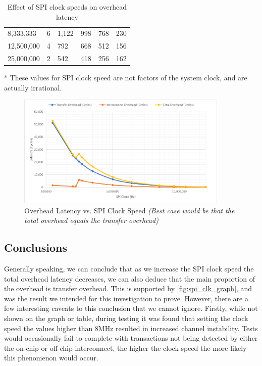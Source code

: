 \begin{table}
\begin{threeparttable}
\begin{tabular}{l|l|l|l|l|l}
     8,333,333\tnote{*}    &  6                   &  1,122               &  998                 & 768                   &  230                                        \\
     12,500,000            &  4                   &  792                 &  668                 & 512                   &  156                                        \\
     25,000,000            &  2                   &  542                 &  418                 & 256                   &  162                                       
    \end{tabular}
    \begin{tablenotes}\footnotesize
        \item[*] These values for SPI clock speed are not factors of the system clock, and are actually irrational.
        \end{tablenotes}
    \end{threeparttable}
    \caption{Effect of SPI clock speeds on overhead latency}
    \label{tbl:spi_clk_results}
\end{table}

\begin{figure}[!htb]
    \centering
    \includegraphics[width=0.9\textwidth]{05_evaluation/images/overhead_vs_spi_clk.png}
    \caption{Overhead Latency vs. SPI Clock Speed \textit{(Best case would be that the total overhead equals the transfer overhead)}} 
    \label{fig:spi_clk_graph}
\end{figure}


\subsection{Conclusions}

Generally speaking, we can conclude that as we increase the SPI clock speed the total overhead latency decreases, we can also deduce that the main proportion of the overhead is transfer overhead. This is supported by \autoref{fig:spi_clk_graph}, and was the result we intended for this investigation to prove. However, there are a few interesting caveats to this conclusion that we cannot ignore. Firstly, while not shown on the graph or table, during testing it was found that setting the clock speed the values higher than 8MHz resulted in increased channel instability. Tests would occasionally fail to complete with transactions not being detected by either the on-chip or off-chip interconnect, the higher the clock speed the more likely this phenomenon would occur.


